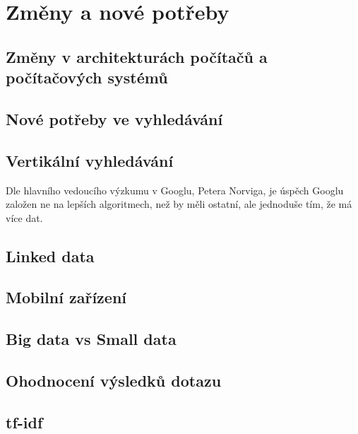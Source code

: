 \documentclass[11pt]{article}
\begin{document}
\section{Změny a nové potřeby}
\subsection{Změny v architekturách počítačů a počítačových systémů}


\subsection{Nové potřeby ve vyhledávání}
\subsection{Vertikální vyhledávání}
Dle hlavního vedoucího výzkumu v Googlu, Petera Norviga, je úspěch Googlu
založen ne na lepších algoritmech, než by měli ostatní, ale jednoduše tím, že
má více dat.
\subsection{Linked data}
\subsection{Mobilní zařízení}

\subsection{Big data vs Small data}

\subsection{Ohodnocení výsledků dotazu}
\subsection{tf-idf}
\end{document}
